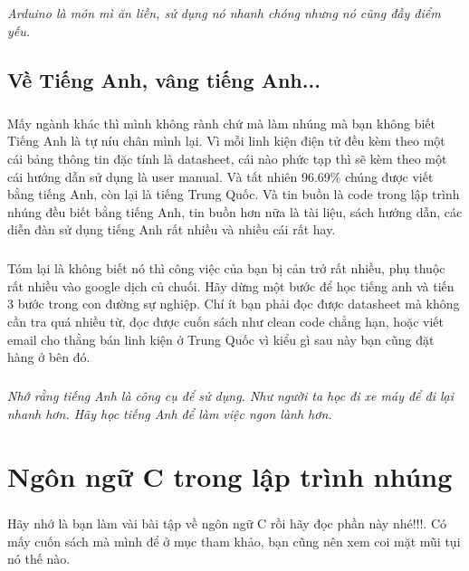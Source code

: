 \documentclass[12pt,a5paper]{book}
\begin{document}
	\paragraph{}
	\textit{Arduino là món mì ăn liền, sử dụng nó nhanh chóng nhưng nó cũng đầy điểm yếu.}
	\section{Về Tiếng Anh, vâng tiếng Anh...}
		\paragraph{}
	Mấy ngành khác thì mình không rành chứ mà làm nhúng mà bạn không biết Tiếng Anh là tự níu chân mình lại. Vì mỗi linh kiện điện tử đều kèm theo một cái bảng thông tin đặc tính là datasheet, cái nào phức tạp thì sẽ kèm theo một cái hướng dẫn sử dụng là user manual. Và tất nhiên 96.69\% chúng được viết bằng tiếng Anh, còn lại là tiếng Trung Quốc. Và tin buồn là code trong lập trình nhúng đều biết bằng tiếng Anh, tin buồn hơn nữa là tài liệu, sách hướng dẫn, các diễn đàn sử dụng tiếng Anh rất nhiều và nhiều cái rất hay.
		\paragraph{}
	Tóm lại là không biết nó thì công việc của bạn bị cản trở rất nhiều, phụ thuộc rất nhiều vào google dịch củ chuối. Hãy dừng một bước để học tiếng anh và tiến 3 bước trong con đường sự nghiệp. Chí ít bạn phải đọc được datasheet mà không cần tra quá nhiều từ, đọc được cuốn sách như clean code chẳng hạn, hoặc viết email cho thằng bán linh kiện ở Trung Quốc vì kiểu gì sau này bạn cũng đặt hàng ở bên đó.
		\paragraph{}
	\textit{Nhớ rằng tiếng Anh là công cụ để sử dụng. Như người ta học đi xe máy để đi lại nhanh hơn. Hãy học tiếng Anh để làm việc ngon lành hơn.}


	\chapter{Ngôn ngữ C trong lập trình nhúng}
	\paragraph{}
Hãy nhớ là bạn làm vài bài tập về ngôn ngữ C rồi hãy đọc phần này nhé!!!. Có mấy cuốn sách mà mình để ở mục tham khảo, bạn cũng nên xem coi mặt mũi tụi nó thế nào.
\end{document}
